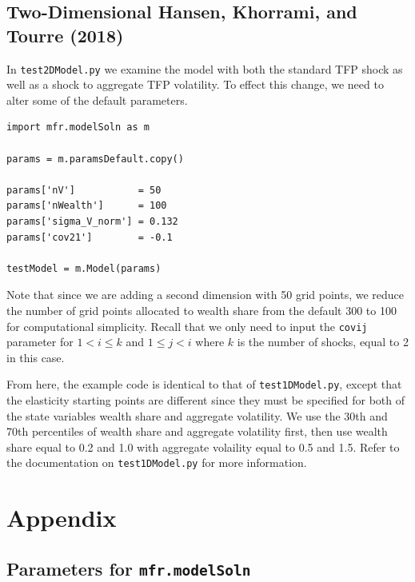 \documentclass[12pt]{article}
\newcommand{\modelSolnProg}{mfr.modelSoln\xspace}
\begin{document}
\subsection{Two-Dimensional Hansen, Khorrami, and Tourre (2018)}

In \texttt{test2DModel.py} we examine the \citet{HKT} model with both the standard
TFP shock as well as a shock to aggregate TFP volatility. To effect this change,
we need to alter some of the default parameters.

\begin{verbatim}
import mfr.modelSoln as m

params = m.paramsDefault.copy()

params['nV']           = 50
params['nWealth']      = 100
params['sigma_V_norm'] = 0.132
params['cov21']        = -0.1

testModel = m.Model(params)
\end{verbatim}

Note that since we are adding a second dimension with 50 grid points, we reduce
the number of grid points allocated to wealth share from the default 300 to 100
for computational simplicity. Recall that we only need to input the
\texttt{covij} parameter for $1 < i \leq k$ and $ 1 \leq j < i$ where $k$ is the
number of shocks, equal to 2 in this case.

From here, the example code is identical to that of \texttt{test1DModel.py}, except
that the elasticity starting points are different since they must be specified
for both of the state variables wealth share and aggregate volatility. We use
the 30th and 70th percentiles of wealth share and aggregate volatility first, then
use wealth share equal to 0.2 and 1.0 with aggregate volaility equal to 0.5 and
1.5. Refer to the documentation on \texttt{test1DModel.py} for more information.

\newpage

\section{Appendix}
\subsection{Parameters for \texttt{\modelSolnProg}}\label{append:Parameters}
\end{document}
